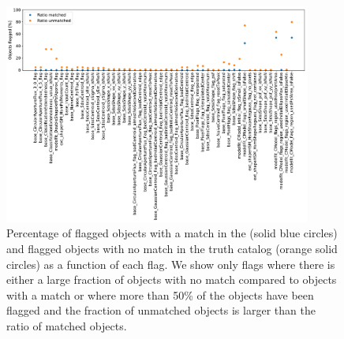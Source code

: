 \documentclass[twocolumn]{aastex62}
\begin{document}
\begin{figure}
\centering
\includegraphics[width=0.9\textwidth]{flags_DC1}
\caption{Percentage of flagged objects with a match in the (solid blue circles) and flagged objects with no match in the truth catalog (orange solid circles) as a function of each flag. We show only flags where there is either a large fraction of objects with no match compared to objects with a match or where more than 50\% of the objects have been flagged and the fraction of unmatched objects is larger than the ratio of matched objects.}
\label{fig:flags_DC1}
\end{figure}
\end{document}
